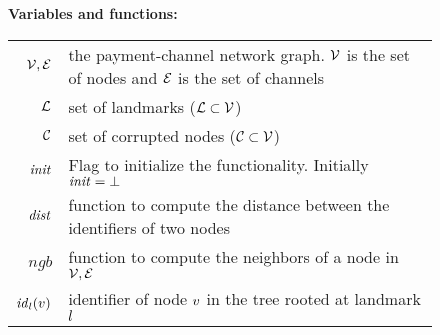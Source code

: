 \begin{figure*}[htb]
	\begin{center}	
		\textbf{Variables and functions:}
		
		\begin{tabular}{r l}
			$\mathcal{V},\mathcal{E}$ & the payment-channel network graph. $\mathcal{V}$ is the set of nodes and $\mathcal{E}$ is the set of channels\\
			$\mathcal{L}$ & set of landmarks ($\mathcal{L} \subset \mathcal{V}$) \\
			$\mathcal{C}$ & set of corrupted nodes ($\mathcal{C} \subset \mathcal{V}$) \\
			$\mathit{init}$ & Flag to initialize the functionality. Initially $\mathit{init} = \bot$\\
			$\mathit{dist}$ & function to compute the distance between the identifiers of two nodes\\
			$\textit{ngb}$ & function to compute the neighbors of a node in $\mathcal{V},\mathcal{E}$\\
			$\mathit{id}_{l}(v)$ & identifier of node $v$ in the tree rooted at landmark $l$ 
		\end{tabular}
\end{center}
\end{figure*}
